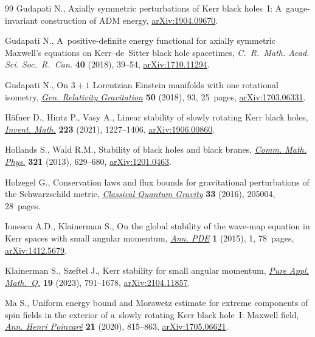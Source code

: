 \documentclass[11pt]{article}
\numberwithin{equation}{section}
\numberwithin{equation}{section}
\begin{document}
\begin{thebibliography}{99}
Gudapati N., Axially symmetric perturbations of {K}err black holes~{I}:
 {A}~gauge-invariant construction of {ADM} energy,
 \href{http://arxiv.org/abs/1904.09670}{arXiv:1904.09670}.

Gudapati N., A~positive-definite energy functional for axially symmetric
 {M}axwell's equations on {K}err--de~{S}itter black hole spacetimes,
 \textit{C.~R.~Math. Acad. Sci. Soc.~R.~Can.} \textbf{40} (2018), 39--54,
 \href{http://arxiv.org/abs/1710.11294}{arXiv:1710.11294}.

Gudapati N., On {$3+1$} {L}orentzian {E}instein manifolds with one rotational
 isometry, \href{https://doi.org/10.1007/s10714-018-2404-2}{\textit{Gen.
 Relativity Gravitation}} \textbf{50} (2018), 93, 25~pages,
 \href{http://arxiv.org/abs/1703.06331}{arXiv:1703.06331}.

H\"afner D., Hintz P., Vasy A., Linear stability of slowly rotating {K}err
 black holes,
 \href{https://doi.org/10.1007/s00222-020-01002-4}{\textit{Invent. Math.}}
 \textbf{223} (2021), 1227--1406,
 \href{http://arxiv.org/abs/1906.00860}{arXiv:1906.00860}.

Hollands S., Wald R.M., Stability of black holes and black branes,
 \href{https://doi.org/10.1007/s00220-012-1638-1}{\textit{Comm. Math. Phys.}}
 \textbf{321} (2013), 629--680,
 \href{http://arxiv.org/abs/1201.0463}{arXiv:1201.0463}.

Holzegel G., Conservation laws and flux bounds for gravitational perturbations
 of the {S}chwarzschild metric,
 \href{https://doi.org/10.1088/0264-9381/33/20/205004}{\textit{Classical
 Quantum Gravity}} \textbf{33} (2016), 205004, 28~pages.

Ionescu A.D., Klainerman S., On the global stability of the wave-map equation
 in {K}err spaces with small angular momentum,
 \href{https://doi.org/10.1007/s40818-015-0001-1}{\textit{Ann. {PDE}}}
 \textbf{1} (2015), 1, 78~pages,
 \href{http://arxiv.org/abs/1412.5679}{arXiv:1412.5679}.

Klainerman S., Szeftel J., Kerr stability for small angular momentum,
 \href{https://doi.org/10.4310/pamq.2023.v19.n3.a1}{\textit{Pure Appl.
 Math.~Q.}} \textbf{19} (2023), 791--1678,
 \href{http://arxiv.org/abs/2104.11857}{arXiv:2104.11857}.

Ma S., Uniform energy bound and {M}orawetz estimate for extreme components of
 spin fields in the exterior of a~slowly rotating {K}err black hole~{I}:
 {M}axwell field,
 \href{https://doi.org/10.1007/s00023-020-00884-7}{\textit{Ann. Henri
 Poincar\'e}} \textbf{21} (2020), 815--863,
 \href{http://arxiv.org/abs/1705.06621}{arXiv:1705.06621}.


\end{thebibliography}
\end{document}
